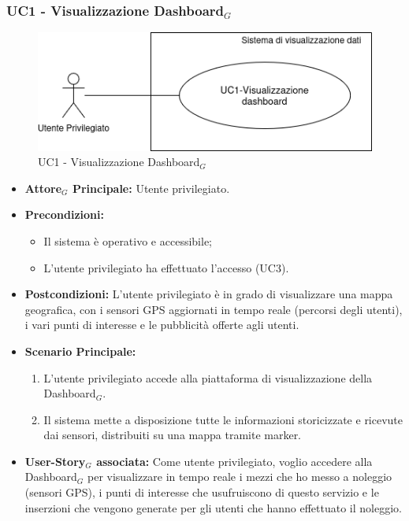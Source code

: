 \documentclass[11pt]{article}
\begin{document}
\begin{justify}
\subsubsection{\textbf{UC1 - Visualizzazione Dashboard$_G$}}
\begin{figure}[H]
    \centering
    \includegraphics[width=0.7\linewidth]{UC1image.png}
    \caption{UC1 - Visualizzazione Dashboard$_G$}
    \label{fig:UC1}
\end{figure}
\begin{itemize}
    \item \textbf{Attore$_G$ Principale:} Utente privilegiato.
    \item \textbf{Precondizioni:} 
        \begin{itemize}
          \item Il sistema è operativo e accessibile;
            \item L'utente privilegiato ha effettuato l'accesso (UC3).
        \end{itemize}
    \item \textbf{Postcondizioni:} L'utente privilegiato è in grado di visualizzare una mappa geografica, con i sensori GPS aggiornati in tempo reale (percorsi degli utenti), i vari punti di interesse e le pubblicità offerte agli utenti.
    \item \textbf{Scenario Principale:}
        \begin{enumerate}
            \item L'utente privilegiato accede alla piattaforma di visualizzazione della Dashboard$_G$.
            \item Il sistema mette a disposizione tutte le informazioni storicizzate e ricevute dai sensori, distribuiti su una mappa tramite marker.
        \end{enumerate}
    \item \textbf{User-Story$_G$ associata:} Come utente privilegiato, voglio accedere alla Dashboard$_G$ per visualizzare in tempo reale i mezzi che ho messo a noleggio (sensori GPS), i punti di interesse che usufruiscono di questo servizio e le inserzioni che vengono generate per gli utenti che hanno effettuato il noleggio.
\end{itemize}


\end{justify}
\end{document}

